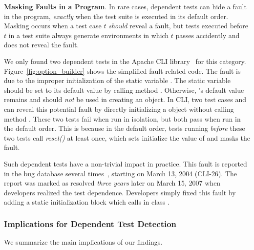\vspace{1mm}

\noindent \textbf{Masking Faults in a Program}. In rare cases,
dependent tests can hide a fault in the
program, \emph{exactly} when the test suite is executed in its default
order. Masking occurs when a test case $t$ \emph{should}
reveal a fault, but tests executed before $t$ in a test suite always
generate environments in which $t$ passes accidently and
does not reveal the fault.



We only found two dependent tests in
the Apache CLI library~\cite{cli} for this category.
Figure~\ref{fig:option_builder} shows the simplified fault-related
code. The fault is due to the improper initialization of the static variable
. The static variable  should be set
to its default value  by calling
method . Otherwise, 's
default value remains  and should \emph{not} be
used in creating an  object.
In CLI, two test cases 
 and 
can reveal this potential fault by directly initializing
a  object without calling method .
These two tests fail when run in isolation,
but both pass when run in the default order. This is because
in the default order, tests running \emph{before} these
two tests call \textit{reset()} at least once, which sets
initialize the value of  and masks the fault.


Such dependent tests have a non-trivial impact in practice.
This fault is reported in the bug database several times~\cite{clibug},
starting on March 13, 2004 (CLI-26). The report was marked as resolved
\emph{three years} later on March 15, 2007 when developers
realized the test dependence. Developers simply fixed this
fault by adding a static initialization block which
calls  in class .


\subsubsection{Implications for Dependent Test Detection}

We summarize the main implications of our findings.

